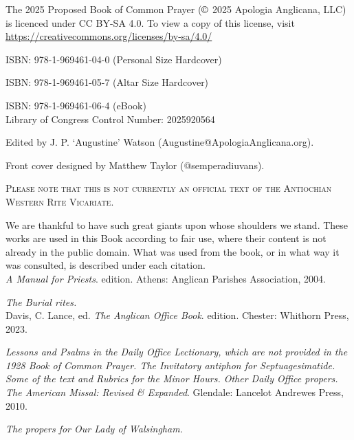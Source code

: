 \setcounter{page}{1}
\frontmatter
{}
{}
\noindent
The 2025 Proposed Book of Common Prayer ($\copyright$ 2025 Apologia Anglicana, LLC) is licenced under CC BY-SA 4.0. To view a copy of this license, visit \url{https://creativecommons.org/licenses/by-sa/4.0/}\\
\par
ISBN: 978-1-969461-04-0 (Personal Size Hardcover)

ISBN: 978-1-969461-05-7 (Altar Size Hardcover)

ISBN: 978-1-969461-06-4 (eBook)\\

Library of Congress Control Number: 2025920564\\
\par\noindent
Edited by J. P. `Augustine' Watson (Augustine@ApologiaAnglicana.org).\par\noindent
Front cover designed by Matthew Taylor (@semperadiuvans).

\begin{center}
	\textsc{Please note that this is not currently an official text of the Antiochian Western Rite Vicariate.}
\end{center}

\par\noindent
We are thankful to have such great giants upon whose shoulders we stand. These works are used in this Book according to fair use, where their content is not already in the public domain. What was used from the book, or in what way it was consulted, is described under each citation.\\

\textit{A Manual for Priests}.  edition. Athens: Anglican Parishes Association, 2004.\par\noindent
\textit{The Burial rites.}\\

Davis, C. Lance, ed. \textit{The Anglican Office Book}.  edition. Chester: Whithorn Press, 2023.\par\noindent
\textit{Lessons and Psalms in the Daily Office Lectionary, which are not provided in the 1928 Book of Common Prayer. The Invitatory antiphon for Septuagesimatide. Some of the text and Rubrics for the Minor Hours. Other Daily Office propers.}\\

\textit{The American Missal: Revised \& Expanded}. Glendale: Lancelot Andrewes Press, 2010.\par\noindent
\textit{The propers for Our Lady of Walsingham.}\\

